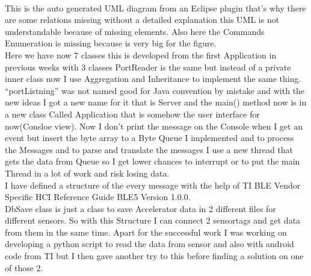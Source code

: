 \documentclass[conference,12pt]{IEEETran}
\begin{document}
\\This is the auto generated UML diagram from an Eclipse plugin that's why there are some relations missing without a detailed explanation this UML is not understandable because of missing elements.
Also here the Commands Enumeration is missing because is very big for the figure.\\
Here we have now 7 classes this is developed from the first Application in previous weeks with 3 classes PortReader is the same but instead of a private inner class now I use Aggregation and Inheritance to implement the same thing. “portListning” was not named good for Java convention by mistake and with the new ideas I got a new name for it that is Server and the main() method now is in a new class Called Application that is somehow the user interface for now(Consloe view).
Now I don’t print the message on the Console when I get an event but insert the byte array to a Byte Queue I implemented and to process the Messages and to parse and translate the messages I use a new thread that gets the data from Queue so I get lower chances to interrupt or to put the main Thread  in a lot of work and risk losing data.\\
I have defined a structure of the every message with the help of TI BLE Vendor Specific HCI Reference Guide BLE5 Version 1.0.0.\\
DbSave class is just a class to save Accelerator data in 2 different files for different sensors.
So with this Structure I can connect 2 sensortags and get data from them in the same time.
Apart for the successful work I was working on developing a python script to read the data from sensor and also with android code from TI but I then gave another try to this before finding a solution on one of those 2.\\
\end{document}
